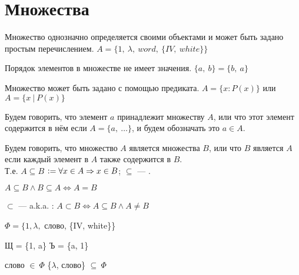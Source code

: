 \section{Множества}\label{sec:ch-1-sec-1}


\begin{definition}
    \begin{compactenum}
        \item Множество однозначно определяется своими объектами и может быть задано простым перечислением. $A = \{1,\ \lambda,\ word,\ \{IV,\ white\}\}$
        \item Порядок элементов в множестве не имеет значения. $\{a,\ b\} = \{b,\ a\}$
        \item Множество может быть задано с помощью предиката. $A = \{x : P(x)\}$ или $A = \{x\ |\ P(x)\}$
    \end{compactenum}
\end{definition}

Будем говорить, что элемент $a$ принадлежит множеству $A$,
или что этот элемент содержится в нём если $A = \{a,\ \ldots\}$, и будем обозначать это $a \in A$.

\begin{definition}
    Будем говорить, что множество $A$ является  множества $B$,
    или что $B$ является  $A$ если каждый элемент в $A$ также содержится в $B$.\\
    [1ex]
    Т.е. $A \subseteq B$ $\vcentcolon= \forall x \in A \Rightarrow x \in B$; $\subseteq$ --- .
\end{definition}

\begin{sh-proposition}
    $A \subseteq B \land B \subseteq A \Leftrightarrow A = B$
\end{sh-proposition}

\begin{definition}
    $\subset$ —  a.k.a. : $A \subset B \Leftrightarrow A \subseteq B \land A \neq B$
\end{definition}

\begin{examples}
    \begin{compactitem}
        \item $\Phi=\{1, \lambda, $ слово, \{IV, white\}\}
        \item Щ = \{1, a\} \quad Ъ = \{a, 1\}
        \item слово $\in ~\Phi$ \quad \{$\lambda$, слово\} $\subseteq ~\Phi$
    \end{compactitem}
\end{examples}

